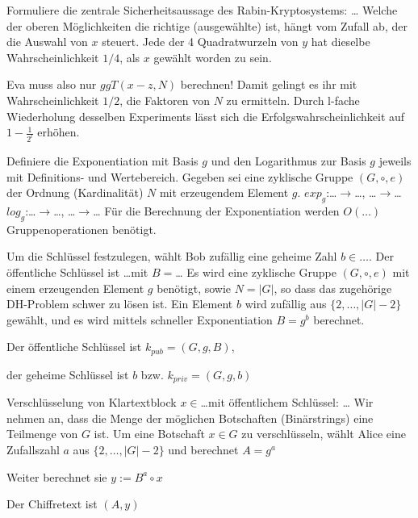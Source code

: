 \documentclass[avery5371, frame]{flashcards}
\begin{document}
\begin{flashcard}{Formuliere die zentrale Sicherheitsaussage des Rabin-Kryptosystems: \dots}
    Welche der oberen Möglichkeiten die richtige (ausgewählte) ist, hängt vom Zufall ab, der die Auswahl von $x$ steuert. Jede der 4 Quadratwurzeln von $y$ hat dieselbe Wahrscheinlichkeit $1/4$, als $x$ gewählt worden zu sein.

    Eva muss also nur $ggT(x-z,N)$ berechnen! Damit gelingt es ihr mit Wahrscheinlichkeit $1/2$, die Faktoren von $N$ zu ermitteln. Durch l-fache Wiederholung desselben Experiments lässt sich die Erfolgswahrscheinlichkeit auf $1-\frac{1}{2^l}$ erhöhen.
\end{flashcard}

\begin{flashcard}{Definiere die Exponentiation mit Basis $g$ und den Logarithmus zur Basis $g$ jeweils mit Definitions- und Wertebereich.}
    Gegeben sei eine zyklische Gruppe $(G,\circ,e)$ der Ordnung (Kardinalität) $N$ mit erzeugendem Element $g$.
    $exp_g$:\dots $\rightarrow$\dots, \dots$\rightarrow$\dots
    $log_g$:\dots $\rightarrow$\dots, \dots$\rightarrow$\dots
    Für die Berechnung der Exponentiation werden $O(\dots)$ Gruppenoperationen benötigt.
\end{flashcard}

\begin{flashcard}{Um die Schlüssel festzulegen, wählt Bob zufällig eine geheime Zahl $b\in\dots$. Der öffentliche Schlüssel ist \dots mit $B=$\dots}
    Es wird eine zyklische Gruppe $(G,\circ,e)$ mit einem erzeugenden Element $g$ benötigt, sowie $N=|G|$, so dass das zugehörige DH-Problem schwer zu lösen ist. Ein Element $b$ wird zufällig aus $\{2 ,\dots,|G|-2\}$ gewählt, und es wird mittels schneller Exponentiation $B=g^b$ berechnet.

    Der öffentliche Schlüssel ist $k_{pub}= (G,g,B)$,

    der geheime Schlüssel ist $b$ bzw. $k_{priv}=(G,g,b)$
\end{flashcard}

\begin{flashcard}{Verschlüsselung von Klartextblock $x\in$\dots mit öffentlichem Schlüssel: \dots}
    Wir nehmen an, dass die Menge der möglichen Botschaften (Binärstrings) eine Teilmenge von $G$ ist. Um eine Botschaft $x\in G$ zu verschlüsseln, wählt Alice eine Zufallszahl $a$ aus $\{2,\dots,|G|-2\}$ und berechnet $A=g^a$

    Weiter berechnet sie $y:=B^a \circ x$

    Der Chiffretext ist $(A,y)$
\end{flashcard}
\end{document}
